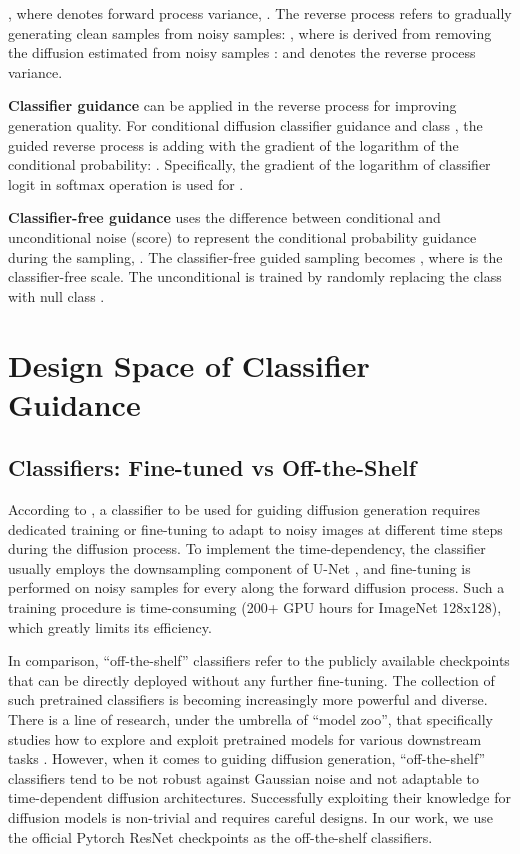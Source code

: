 \documentclass{article}
\theoremstyle{definition}
\begin{document}
, where  denotes forward process variance, . 
The reverse process refers to gradually generating clean samples from noisy samples: , where  is derived from removing the diffusion estimated  from noisy samples :  and   
 denotes the reverse process variance. 

\textbf{Classifier guidance} \citep{dhariwal2021diffusion} can be applied in the reverse process for improving generation quality. For conditional diffusion classifier guidance and class , the guided reverse process is adding  with the gradient of the logarithm of the conditional probability: . 
Specifically, the gradient of the logarithm of classifier  logit in softmax operation  is used for . 

\textbf{Classifier-free guidance} \citep{ho2022classifier} uses the difference between conditional and unconditional noise (score) to represent the conditional probability guidance during the sampling, . 
The classifier-free guided sampling becomes
, where  is the classifier-free scale. The unconditional  is trained by randomly replacing the class with null class . 


\section{Design Space of Classifier Guidance}

\subsection{Classifiers: Fine-tuned vs Off-the-Shelf }
According to \cite{dhariwal2021diffusion}, a classifier to be used for guiding diffusion generation requires dedicated training or fine-tuning to adapt to noisy images at different time steps during the diffusion process. 
To implement the time-dependency, the classifier usually employs the downsampling component of U-Net \citep{ronneberger2015u}, and fine-tuning is performed on noisy samples  for every  along the forward diffusion process.
Such a training procedure is time-consuming (200+ GPU hours for ImageNet 128x128), which greatly limits its efficiency. 

In comparison, ``off-the-shelf'' classifiers refer to the publicly available checkpoints that can be directly deployed without any further fine-tuning. 
The collection of such pretrained classifiers is becoming increasingly more powerful and diverse. There is a line of research, under the umbrella of ``model zoo'', that specifically studies how to explore and exploit pretrained models for various downstream tasks \citep{shu2021zoo, dong2022zood, chen2023explore, luo2023diff}.  
However, when it comes to guiding diffusion generation, ``off-the-shelf'' classifiers tend to be not robust against Gaussian noise and not adaptable to time-dependent diffusion architectures. Successfully exploiting their knowledge for diffusion models is non-trivial and requires careful designs. 
In our work, we use the official Pytorch ResNet
checkpoints as the off-the-shelf classifiers. 
\end{document}
